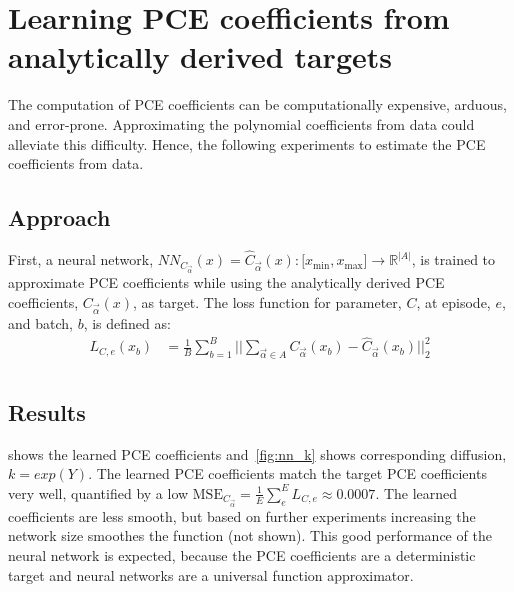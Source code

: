\documentclass[letterpaper, 10 pt, conference, twocolumn]{ieeeconf}  %
\begin{document}
\section{Learning PCE coefficients from analytically derived targets}\label{sec:learn_pce_coefs1}
The computation of PCE coefficients can be computationally expensive, arduous, and error-prone. Approximating the polynomial coefficients from data could alleviate this difficulty.  Hence, the following experiments to estimate the PCE coefficients from data.
\subsection{Approach}
First, a neural network, $NN_{C_{\vec\alpha}}(x)=\hat C_{\vec\alpha}(x):\mathds [x_\text{min},x_\text{max}] \rightarrow \mathds R^{\lvert A \rvert}$, is trained to approximate PCE coefficients while using the analytically derived PCE coefficients, $C_{\vec\alpha}(x)$, as target. The loss function for parameter, $C$, at episode, $e$, and batch, $b$, is defined as:
\begin{equation}
\begin{aligned}
  L_{C,e}(x_b) &= \frac{1}{B}\sum_{b=1}^B \lvert\lvert \sum_{\vec\alpha\in A}C_{\vec\alpha}(x_b) - \hat C_{\vec\alpha}(x_b)\rvert\rvert_2^2\\
\end{aligned}
\label{eq:loss_k}
\end{equation}


\subsection{Results}
 shows the learned PCE coefficients and~\cref{fig:nn_k} shows corresponding diffusion, $k=exp(Y)$. The learned PCE coefficients match the target PCE coefficients very well, quantified by a low  $\text{MSE}_{C_{\vec\alpha}} = \frac{1}{E}\sum_e^E L_{C,e} \approx 0.0007$. The learned coefficients are less smooth, but based on further experiments increasing the network size smoothes the function (not shown). This good performance of the neural network is expected, because the PCE coefficients are a deterministic target and neural networks are a universal function approximator. 
\end{document}
